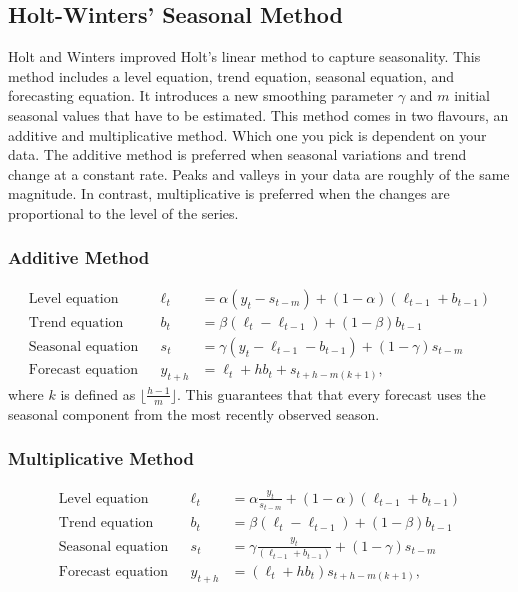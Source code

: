 \documentclass{article}
\begin{document}
  \newpage
  \subsection{Holt-Winters' Seasonal Method}
  Holt and Winters improved Holt's linear method to capture seasonality. This method includes a level equation, trend equation, seasonal equation, and forecasting equation. It introduces a new smoothing parameter $\gamma$ and $m$ initial seasonal values that have to be estimated. This method comes in two flavours, an additive and multiplicative method. Which one you pick is dependent on your data. The additive method is preferred when seasonal variations and trend change at a constant rate. Peaks and valleys in your data are roughly of the same magnitude. In contrast, multiplicative is preferred when the changes are proportional to the level of the series. 

  \subsubsection{Additive Method}
  \begin{align*}
    \text{Level equation}   &&\ell_{t} &= \alpha(y_{t} - s_{t-m}) + (1 - \alpha)(\ell_{t-1} + b_{t-1})\\
    \text{Trend equation}   &&b_{t} &= \beta(\ell_{t} - \ell_{t-1}) + (1 - \beta)b_{t-1}\\
    \text{Seasonal equation}   &&s_{t} &= \gamma (y_{t}-\ell_{t-1}-b_{t-1}) + (1-\gamma)s_{t-m}\\
    \text{Forecast equation}   && \hat{y}_{t+h} &= \ell_{t} + hb_{t} + s_{t+h-m(k+1)},
  \end{align*}
  where $k$ is defined as $\lfloor\frac{h-1}{m}\rfloor$. This guarantees that that every forecast uses the seasonal component from the most recently observed season. 

  \subsubsection{Multiplicative Method}
  \begin{align*}
    \text{Level equation}   &&\ell_{t} &= \alpha \frac{y_{t}}{s_{t-m}} + (1 - \alpha)(\ell_{t-1} + b_{t-1})\\
    \text{Trend equation}   &&b_{t} &= \beta(\ell_{t}-\ell_{t-1}) + (1 - \beta)b_{t-1}\\
    \text{Seasonal equation}   &&s_{t} &= \gamma \frac{y_{t}}{(\ell_{t-1} + b_{t-1})} + (1 - \gamma)s_{t-m}\\
    \text{Forecast equation}   &&\hat{y}_{t+h} &= (\ell_{t} + hb_{t})s_{t+h-m(k+1)},
  \end{align*}
\end{document}
